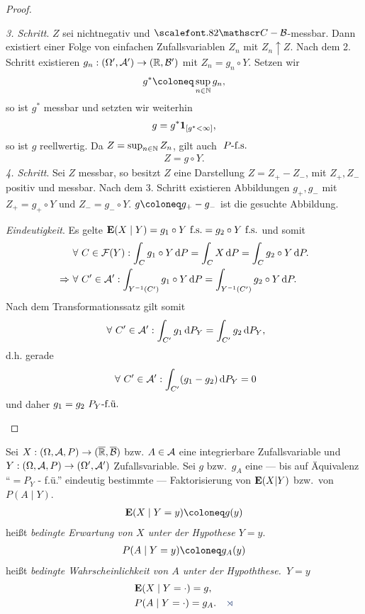 \begin{proof}
\begin{proofenum}
\textit{3. Schritt}. $Z$ sei nichtnegativ und $\CC-\BB$-messbar. Dann existiert
einer Folge von einfachen Zufallsvariablen $Z_n$ mit $Z_n\uparrow Z$. Nach dem
2. Schritt existieren $g_n: (\Omega',\AA')\to(\R,\BB')$ mit $Z_n = g_n\circ Y$.
Setzen wir
\begin{align*}
g^* \defl \sup_{n\in\N} g_n,
\end{align*}
so ist $g^*$ messbar und setzten wir weiterhin
\begin{align*}
g = g^*\Id_{[g^*< \infty]},
\end{align*}
so ist $g$ reellwertig. Da $Z= \sup_{n\in\N} Z_n$, gilt auch $\Pfs$
\begin{align*}
Z = g\circ Y.
\end{align*}
\textit{4. Schritt}. Sei $Z$ messbar, so besitzt $Z$
eine Darstellung $Z=Z_+-Z_-$, mit $Z_+,Z_-$ positiv und messbar. Nach dem 3.
Schritt existieren Abbildungen $g_+,g_-$ mit $Z_+ = g_+\circ Y$ und $Z_- =
g_-\circ Y$. $g\defl g_+-g_-$ ist die gesuchte Abbildung.
\item\textit{Eindeutigkeit}.
Es gelte $\E(X\mid Y) = g_1\circ Y \fs = g_2\circ Y \fs$ und somit
\begin{align*}
&\forall {C\in\FF(Y)} : \int_C g_1\circ Y \dP = \int_C
X \dP = \int_C g_2\circ Y \dP.\\
\Rightarrow &\forall {C'\in\AA'} : \int_{Y^{-1}(C')} g_1\circ Y \dP =
\int_{Y^{-1}(C')} g_2\circ Y \dP.
\end{align*}
Nach dem Transformationssatz gilt somit
\begin{align*}
\forall {C'\in\AA'} : \int_{C'} g_1 \dP_Y =
\int_{C'} g_2 \dP_Y,
\end{align*}
d.h. gerade
\begin{align*}
\forall {C'\in\AA'} : \int_{C'} (g_1-g_2) \dP_Y = 0
\end{align*}
und daher $g_1=g_2 \fu{P_{Y}}$\qedhere
\end{proofenum}
\end{proof}

\begin{defn}
\label{defn:10.4}
Sei $X: (\Omega, {\AA}, P)\to (\RA,\overline{\BB})$  
bzw. $A\in {\AA}$ eine integrierbare Zufallsvariable und $Y : (\Omega,
{\AA},P)\to (\Omega ', {\AA}')$ Zufallsvariable. Sei $g$ bzw.\ $g_{A}$ eine ---
bis auf Äquivalenz ``$=P_{Y}$ - f.ü.'' eindeutig bestimmte --- Faktorisierung
von $\E(X|Y)$ bzw.\ von $P(A\mid Y)$.
\begin{align*}
\E(X\mid Y=y)\defl g(y)
\end{align*}
heißt \emph{bedingte Erwartung von $X$ unter der Hypothese
$Y=y$}.
\begin{align*}
P(A\mid Y=y) \defl g_{A}(y)
\end{align*}
heißt \emph{bedingte Wahrscheinlichkeit von $A$ unter der
Hypoththese.~$Y=y$}
\begin{align*}
&\E(X\mid Y=\cdot)=g,\\
&P(A\mid Y=\cdot )=g_{A}.\fishhere
\end{align*}
\end{defn}

